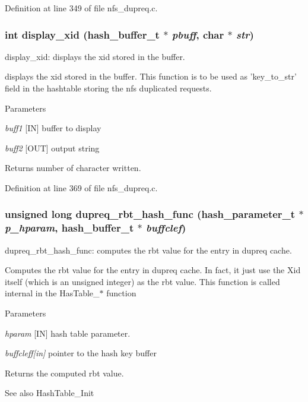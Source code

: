 Definition at line 349 of file nfs\_\-dupreq.c.
\subsubsection[{display\_\-xid}]{\setlength{\rightskip}{0pt plus 5cm}int display\_\-xid (hash\_\-buffer\_\-t $\ast$ {\em pbuff}, \/  char $\ast$ {\em str})}\label{nfs__dupreq_8c_a30afd5b6d3dff5d4d7d4767089d59b44}
display\_\-xid: displays the xid stored in the buffer.

displays the xid stored in the buffer. This function is to be used as 'key\_\-to\_\-str' field in the hashtable storing the nfs duplicated requests.


\begin{DoxyParams}{Parameters}
\item[{\em buff1}][IN] buffer to display \item[{\em buff2}][OUT] output string\end{DoxyParams}
\begin{DoxyReturn}{Returns}
number of character written. 
\end{DoxyReturn}


Definition at line 369 of file nfs\_\-dupreq.c.
\subsubsection[{dupreq\_\-rbt\_\-hash\_\-func}]{\setlength{\rightskip}{0pt plus 5cm}unsigned long dupreq\_\-rbt\_\-hash\_\-func (hash\_\-parameter\_\-t $\ast$ {\em p\_\-hparam}, \/  hash\_\-buffer\_\-t $\ast$ {\em buffclef})}\label{nfs__dupreq_8c_acd77080a96d71b76efbdee9178171504}
dupreq\_\-rbt\_\-hash\_\-func: computes the rbt value for the entry in dupreq cache.

Computes the rbt value for the entry in dupreq cache. In fact, it just use the Xid itself (which is an unsigned integer) as the rbt value. This function is called internal in the HasTable\_\-$\ast$ function


\begin{DoxyParams}{Parameters}
\item[{\em hparam}][IN] hash table parameter. \item[{\em buffcleff\mbox{[}in\mbox{]}}]pointer to the hash key buffer\end{DoxyParams}
\begin{DoxyReturn}{Returns}
the computed rbt value.
\end{DoxyReturn}
\begin{DoxySeeAlso}{See also}
HashTable\_\-Init 
\end{DoxySeeAlso}


